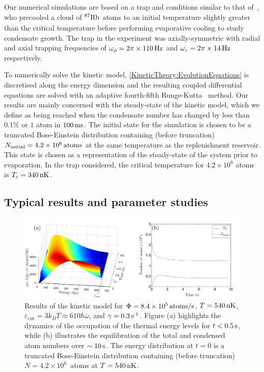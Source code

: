 Our numerical simulations are based on a trap and conditions similar to that of~\citep{Kohl:2002}, who precooled a cloud of $\nucl{87}{}{Rb}$ atoms to an initial temperature slightly greater than the critical temperature before performing evaporative cooling to study condensate growth.  The trap in the experiment was axially-symmetric with radial and axial trapping frequencies of  $\omega_\rho = \unit[2 \pi \times 110]{Hz}$ and $\omega_z = \unit[2\pi \times 14]{Hz}$ respectively.

To numerically solve the kinetic model, \eqref{KineticTheory:EvolutionEquations} is discretised along the energy dimension and the resulting coupled differential equations are solved with an adaptive fourth-fifth Runge-Kutta~\citep{NumericalRecipes} method. Our results are mainly concerned with the steady-state of the kinetic model, which we define as being reached when the condensate number has changed by less than $0.1\%$ or $1$ atom in $\unit[100]{ms}$.  The initial state for the simulation is chosen to be a truncated Bose-Einstein distribution containing (before truncation) $N_\text{initial} = \unit[4.2\times 10^6]{atoms}$ at the same temperature as the replenishment reservoir.  This state is chosen as a representation of the steady-state of the system prior to evaporation.  In the trap considered, the critical temperature for $4.2\times 10^6$ atoms is $T_c = \unit[340]{nK}$.


\subsection{Typical results and parameter studies}
\label{KineticTheory:ParameterStudies}

\begin{figure}
    \centering
    \includegraphics[width=15cm]{EnergyDistributionFunctionEvolution}
    \caption{Results of the kinetic model for $\Phi = \unit[8.4 \times 10^5]{atoms/s}$, $T=\unit[540]{nK}$, $\varepsilon_\text{cut} = 3 k_B T \approx 610 \hbar \overline{\omega}$, and $\gamma = \unit[0.3]{s\textsuperscript{-1}}$. Figure (a) highlights the dynamics of the occupation of the thermal energy levels for $t < \unit[0.5]{s}$, while (b) illustrates the equilibration of the total and condensed atom numbers over $\sim \unit[10]{s}$. The energy distribution at $t=0$ is a truncated Bose-Einstein distribution containing (before truncation) $N=4.2\times 10^6$~atoms at $T=\unit[540]{nK}$.
    }
    \label{KineticTheory:EnergyDistributionFunctionEvolution}
\end{figure}


